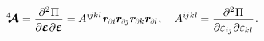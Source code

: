 \nopagebreak\vspace{-0.1em}
\begin{equation}
   \stiffnesstensor
   \hspace{.1ex} =
   \displaystyle\frac{
      \raisemath{-0.1em}{ \partial^2 \hspace{.1ex} \potential }
   }{
      \raisemath{-0.1em}{
         \partial \infinitesimaldeformation \hspace{.1ex}
         \partial \infinitesimaldeformation}
   }
   = \hspace{-0.1ex}
   A^{i\hspace{-0.1ex}jk\hspace{.06ex}l} \hspace{.16ex}
   \locationvector_\differentialindex{i}
   \locationvector_\differentialindex{\hspace{-0.1ex}j}
   \locationvector_\differentialindex{k}
   \locationvector_\differentialindex{l}
   \hspace{.1ex} ,
   \hspace{1em}
   A^{i\hspace{-0.1ex}jk\hspace{.06ex}l} \hspace{-0.16ex}
   =
   \displaystyle\frac{
      \raisemath{-0.1em}{ \partial^2 \hspace{.1ex} \potential }
   }
   {
      \raisemath{-0.1em}{\partial \varepsilon_{ i\hspace{-0.1ex}j } \hspace{.1ex}
      \partial \varepsilon_{ \hspace{-0.1ex}k\hspace{.06ex}l }
}}
\hspace{.16ex}
.
\end{equation}

